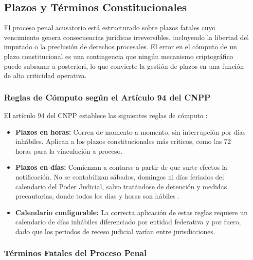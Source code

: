 \subsection{Plazos y Términos Constitucionales}\label{sec:plazos-terminos}

El proceso penal acusatorio está estructurado sobre plazos fatales cuyo vencimiento genera consecuencias jurídicas irreversibles, incluyendo la libertad del imputado o la preclusión de derechos procesales. El error en el cómputo de un plazo constitucional es una contingencia que ningún mecanismo criptográfico puede subsanar a posteriori, lo que convierte la gestión de plazos en una función de alta criticidad operativa.

\subsubsection{Reglas de Cómputo según el Artículo 94 del CNPP}

El artículo 94 del CNPP establece las siguientes reglas de cómputo \cite{cnpp2021}:

\begin{itemize}
  \item \textbf{Plazos en horas:} Corren de momento a momento, sin interrupción por días inhábiles. Aplican a los plazos constitucionales más críticos, como las 72 horas para la vinculación a proceso.

  \item \textbf{Plazos en días:} Comienzan a contarse a partir de que surte efectos la notificación. No se contabilizan sábados, domingos ni días feriados del calendario del Poder Judicial, salvo tratándose de detención y medidas precautorias, donde todos los días y horas son hábiles \cite{cnpp2021}.

  \item \textbf{Calendario configurable:} La correcta aplicación de estas reglas requiere un calendario de días inhábiles diferenciado por entidad federativa y por fuero, dado que los periodos de receso judicial varían entre jurisdicciones.
\end{itemize}

\subsubsection{Términos Fatales del Proceso Penal}

